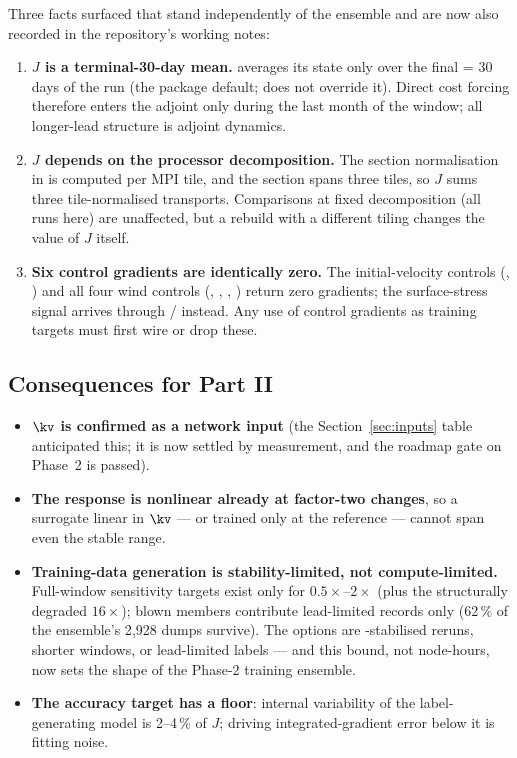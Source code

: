 Three facts surfaced that stand independently of the ensemble and are now also
recorded in the repository's working notes:

\begin{enumerate}[nosep]
  \item \textbf{$J$ is a terminal-30-day mean.}  averages its
        state only over the final  = 30 days of the run
        (the package default;  does not override it). Direct
        cost forcing therefore enters the adjoint only during the last month
        of the window; all longer-lead structure is adjoint dynamics.
  \item \textbf{$J$ depends on the processor decomposition.} The section
        normalisation in  is computed per MPI
        tile, and the section spans three tiles, so $J$ sums three
        tile-normalised transports. Comparisons at fixed decomposition (all
        runs here) are unaffected, but a rebuild with a different tiling
        changes the value of $J$ itself.
  \item \textbf{Six control gradients are identically zero.} The
        initial-velocity controls (, ) and all
        four wind controls (, , ,
        ) return zero gradients; the surface-stress signal arrives
        through / instead. Any use of control
        gradients as training targets must first wire or drop these.
\end{enumerate}

\subsection{Consequences for Part II}
\label{sec:results-part2}

\begin{itemize}[nosep]
  \item \textbf{$\kv$ is confirmed as a network input} (the
        Section~\ref{sec:inputs} table anticipated this; it is now settled by
        measurement, and the roadmap gate on Phase~2 is passed).
  \item \textbf{The response is nonlinear already at factor-two changes}, so
        a surrogate linear in $\kv$ --- or trained only at the reference ---
        cannot span even the stable range.
  \item \textbf{Training-data generation is stability-limited, not
        compute-limited.} Full-window sensitivity targets exist only for
        $0.5\times$--$2\times$ (plus the structurally degraded $16\times$);
        blown members contribute lead-limited records only (62\,\% of the
        ensemble's 2{,}928 dumps survive). The options are
        -stabilised reruns, shorter windows, or
        lead-limited labels --- and this bound, not node-hours, now sets the
        shape of the Phase-2 training ensemble.
  \item \textbf{The accuracy target has a floor}: internal variability of the
        label-generating model is 2--4\,\% of $J$; driving integrated-gradient
        error below it is fitting noise.
\end{itemize}

